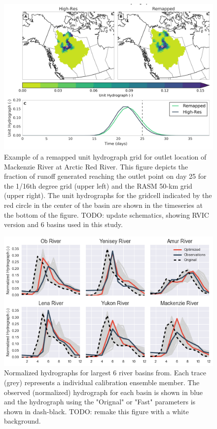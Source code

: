 \documentclass[jgrga, draft]{agutex}
\begin{document}
\clearpage
\begin{figure}
\noindent\includegraphics[width=40pc,natwidth=1]{uh_remap_schematic}
\caption{Example of a remapped unit hydrograph grid for outlet location of Mackenzie River at Arctic Red River. This figure depicts the fraction of runoff generated reaching the outlet point on day 25 for the 1/16th degree grid (upper left) and the RASM 50-km grid (upper right). The unit hydrographs for the gridcell indicated by the red circle in the center of the basin are shown in the timeseries at the bottom of the figure. TODO: update schematics, showing RVIC version and 6 basins used in this study.}
\label{fig:uh_remap_schematic}
\end{figure}

\clearpage
\begin{figure}
\noindent\includegraphics[width=40pc,natwidth=1]{calibration_hydrographs}
\caption{Normalized hydrographs for largest 6 river basins from.  Each trace (grey) represents a individual calibration ensemble member. The observed (normalized) hydrograph for each basin is shown in blue and the hydrograph using the "Orignal" or "Fast" parameters is shown in dash-black. TODO: remake this figure with a white background.}
\label{fig:calibration_hydrographs}
\end{figure}
\end{document}
